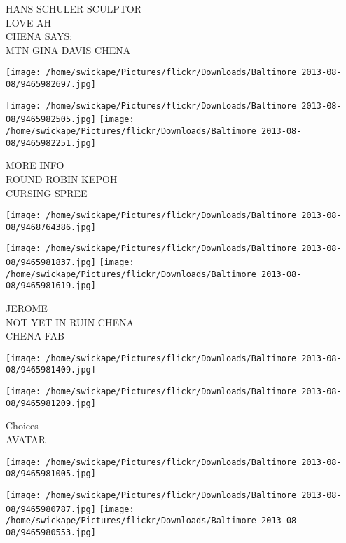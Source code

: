 \documentclass[10pt,letterpaper]{article}
\begin{document}
HANS SCHULER SCULPTOR\\
LOVE AH\\
CHENA SAYS:\\
MTN GINA DAVIS CHENA\\
\pagebreak

\texttt{[image: /home/swickape/Pictures/flickr/Downloads/Baltimore 2013-08-08/9465982697.jpg]}

\vspace{0.25in}
\texttt{[image: /home/swickape/Pictures/flickr/Downloads/Baltimore 2013-08-08/9465982505.jpg]}
\texttt{[image: /home/swickape/Pictures/flickr/Downloads/Baltimore 2013-08-08/9465982251.jpg]}

MORE INFO\\
ROUND ROBIN KEPOH\\
CURSING SPREE\\
\pagebreak

\texttt{[image: /home/swickape/Pictures/flickr/Downloads/Baltimore 2013-08-08/9468764386.jpg]}

\vspace{0.25in}
\texttt{[image: /home/swickape/Pictures/flickr/Downloads/Baltimore 2013-08-08/9465981837.jpg]}
\texttt{[image: /home/swickape/Pictures/flickr/Downloads/Baltimore 2013-08-08/9465981619.jpg]}

JEROME\\
NOT YET IN RUIN CHENA\\
CHENA FAB\\
\pagebreak

\texttt{[image: /home/swickape/Pictures/flickr/Downloads/Baltimore 2013-08-08/9465981409.jpg]}

\vspace{0.25in}
\texttt{[image: /home/swickape/Pictures/flickr/Downloads/Baltimore 2013-08-08/9465981209.jpg]}

Choices\\
AVATAR\\
\pagebreak

\texttt{[image: /home/swickape/Pictures/flickr/Downloads/Baltimore 2013-08-08/9465981005.jpg]}

\vspace{0.25in}
\texttt{[image: /home/swickape/Pictures/flickr/Downloads/Baltimore 2013-08-08/9465980787.jpg]}
\texttt{[image: /home/swickape/Pictures/flickr/Downloads/Baltimore 2013-08-08/9465980553.jpg]}
\end{document}
